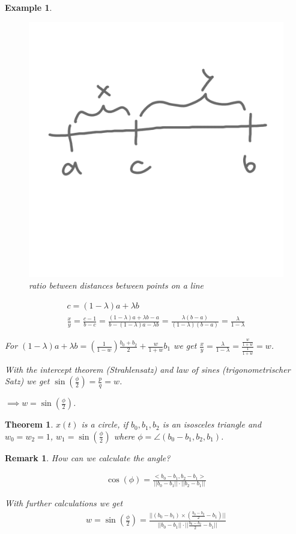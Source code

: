 \documentclass[]{article}
\newtheorem{theorem}{Theorem}
\newtheorem{example}{Example}
\newtheorem{remark}{Remark}
\begin{document}
\begin{example}
	\begin{figure}[h!]
		\centering
		\includegraphics[width=0.3\linewidth]{figures/nurbs_ratio}
		\caption{ratio between distances between points on a line}
		\label{fig:nurbs_ratio}
	\end{figure}
	
	\begin{align*}
		c = (1-\lambda)a + \lambda b\\
		\frac{x}{y} = \frac{c-1}{b-c} = \frac{(1-\lambda)a + \lambda b - a}{b - (1-\lambda) a - \lambda b} = \frac{\lambda(b-a)}{(1-\lambda)(b-a)} = \frac{\lambda}{1-\lambda}
	\end{align*}
	
	For $(1-\lambda)a + \lambda b = (\frac{1}{1-w})\frac{b_0+b_2}{2} + \frac{w}{1+w}b_1$ we get $\frac{x}{y} = \frac{\lambda}{1-\lambda} = \frac{\frac{w}{1+w}}{\frac{1}{1+w}} = w$.
	
	With the intercept theorem (Strahlensatz) and law of sines (trigonometrischer Satz) we get $\sin(\frac{\phi}{2}) = \frac{p}{q} = w$.
	
	$\implies w = \sin(\frac{\phi}{2})$.
\end{example}

\begin{theorem}
	$x(t)$ is a circle, if $b_0, b_1, b_2$ is an isosceles triangle and $w_0=w_2=1$, $w_1 = \sin(\frac{\phi}{2})$ where $\phi = \angle (b_0-b_1, b_2, b_1)$.
\end{theorem}

\begin{remark}
	How can we calculate the angle?
	
	\begin{align*}
		\cos(\phi) = \frac{<b_0-b_1, b_2-b_1>}{||b_0-b_1||\cdot ||b_2-b_1||}
	\end{align*}
	
	With further calculations we get
	\begin{align*}
		w = \sin(\frac{\phi}{2}) = \frac{||(b_0-b_1)\times (\frac{b_0 - b_2}{2} - b_1)||}{||b_0 - b_1|| \cdot ||\frac{b_0 - b_2}{2} - b_1||}
	\end{align*}
\end{remark}
\end{document}
